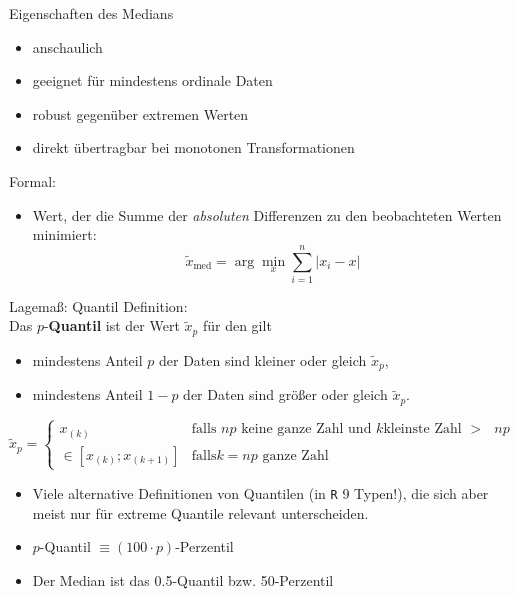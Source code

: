 \documentclass[
  10pt,
  ignorenonframetext,
]{beamer}
\providecommand{\tightlist}{%
  \setlength{\itemsep}{0pt}\setlength{\parskip}{0pt}}
\begin{document}
\begin{frame}{Eigenschaften des Medians}
\protect\hypertarget{eigenschaften-des-medians}{}
\begin{itemize}
\tightlist
\item
  anschaulich
\item
  geeignet für mindestens ordinale Daten
\item
  robust gegenüber extremen Werten
\item
  direkt übertragbar bei monotonen Transformationen
\end{itemize}

Formal:

\begin{itemize}
\tightlist
\item
  Wert, der die Summe der \emph{absoluten} Differenzen zu den
  beobachteten Werten minimiert:
  \[\tilde x_{\text{med}} = \arg\min_x \sum^n_{i=1} |x_i - x|\]
\end{itemize}
\end{frame}

\begin{frame}[fragile]{Lagemaß: Quantil}
\protect\hypertarget{lagemauxdf-quantil}{}
Definition:\\
Das \(p\)-\textbf{Quantil} ist der Wert \(\tilde x_p\) für den gilt

\begin{itemize}
\tightlist
\item
  mindestens Anteil \(p\) der Daten sind kleiner oder gleich
  \(\tilde x_p\),
\item
  mindestens Anteil \(1-p\) der Daten sind größer oder gleich
  \(\tilde x_p\).
\end{itemize}

\begin{equation*}
 \tilde x_{p} = \left\{ \begin{array}{ll}
                      x_{(k)} & \text{falls $np$ keine ganze Zahl und $k$
kleinste Zahl $>$ $np$} \\
                      \in \left[x_{(k)} ; x_{(k+1)}\right] & \text{falls
$k=np$ ganze Zahl}
                  \end{array}\right.
\end{equation*}

\begin{itemize}
\tightlist
\item
  Viele alternative Definitionen von Quantilen (in \texttt{R} 9 Typen!),
  die sich aber meist nur für extreme Quantile relevant unterscheiden.
\item
  \(p\)-Quantil \(\equiv (100\cdot p)\)-Perzentil
\item
  Der Median ist das 0.5-Quantil bzw. 50-Perzentil
\end{itemize}
\end{frame}
\end{document}
